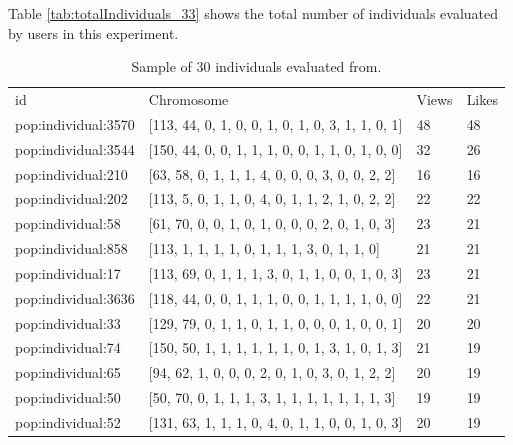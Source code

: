 Table \ref{tab:totalIndividuals_33} shows the total number of individuals
evaluated by users in this experiment.

\begin{table}
\small
\caption{Sample of 30 individuals evaluated from.}
\label{tab:totalIndividuals_32}
\centering
\small
\begin{tabular}{p{3cm} p{4cm} p{3cm} p{3cm}}
\hline\noalign{\smallskip}
 id & Chromosome & Views & Likes  \\
\noalign{\smallskip}\hline\noalign{\smallskip}
\small{pop:individual:3570} & \small{[113, 44, 0, 1, 0, 0, 1, 0, 1, 0, 3, 1, 1, 0, 1]}
& \small{48} & \small{48}\\ \hline
\small{pop:individual:3544} & \small{[150, 44, 0, 0, 1, 1, 1, 0, 0, 1, 1, 0, 1, 0, 0]}
& \small{32} & \small{26}\\ \hline
\small{pop:individual:210} & \small{[63, 58, 0, 1, 1, 1, 4, 0, 0, 0, 3, 0, 0, 2, 2]}
& \small{16} & \small{16}\\ \hline
\small{pop:individual:202} & \small{[113, 5, 0, 1, 1, 0, 4, 0, 1, 1, 2, 1, 0, 2, 2]}
& \small{22} & \small{22}\\ \hline
\small{pop:individual:58} & \small{[61, 70, 0, 0, 1, 0, 1, 0, 0, 0, 2, 0, 1, 0, 3]}
& \small{23} & \small{21}\\ \hline
\small{pop:individual:858} & \small{[113, 1, 1, 1, 1, 0, 1, 1, 1, 3, 0, 1, 1, 0]}
& \small{21} & \small{21}\\ \hline
\small{pop:individual:17} & \small{[113, 69, 0, 1, 1, 1, 3, 0, 1, 1, 0, 0, 1, 0, 3]}
& \small{23} & \small{21}\\ \hline
\small{pop:individual:3636} & \small{[118, 44, 0, 0, 1, 1, 1, 0, 0, 1, 1, 1, 1, 0, 0]}
& \small{22} & \small{21}\\ \hline
\small{pop:individual:33} & \small{[129, 79, 0, 1, 1, 0, 1, 1, 0, 0, 0, 1, 0, 0, 1]}
& \small{20} & \small{20}\\ \hline
\small{pop:individual:74} & \small{[150, 50, 1, 1, 1, 1, 1, 1, 0, 1, 3, 1, 0, 1, 3]}
& \small{21} & \small{19}\\ \hline
\small{pop:individual:65} & \small{[94, 62, 1, 0, 0, 0, 2, 0, 1, 0, 3, 0, 1, 2, 2]}
& \small{20} & \small{19}\\ \hline
\small{pop:individual:50} & \small{[50, 70, 0, 1, 1, 1, 3, 1, 1, 1, 1, 1, 1, 1, 3]}
& \small{19} & \small{19}\\ \hline
\small{pop:individual:52} & \small{[131, 63, 1, 1, 1, 0, 4, 0, 1, 1, 0, 0, 1, 0, 3]}
& \small{20} & \small{19}\\ \hline

\end{tabular}
\end{table}
